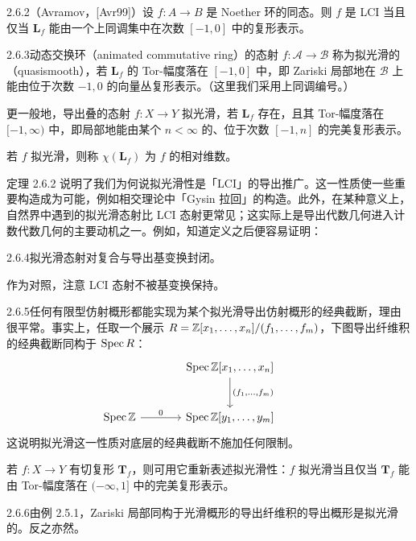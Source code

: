 
\begin{thm}{2.6.2}（Avramov，[Avr99]）设 $f\colon A\to B$ 是 Noether 环的同态。则 $f$ 是 LCI 当且仅当 $\mathbf L_f$ 能由一个上同调集中在次数 $[-1,0]$ 中的复形表示。
\end{thm}

\begin{defn}{2.6.3}动态交换环（animated commutative ring）的态射 $f\colon\mathcal A\to\mathcal B$ 称为拟光滑的（quasismooth），若 $\mathbf L_f$ 的 Tor-幅度落在 $[-1,0]$ 中，即 Zariski 局部地在 $\mathcal B$ 上能由位于次数 $-1,0$ 的向量丛复形表示。（这里我们采用上同调编号。）
\end{defn}

更一般地，导出叠的态射 $f\colon X\to Y$ 拟光滑，若 $\mathbf L_f$ 存在，且其 Tor-幅度落在 $[-1,\infty)$ 中，即局部地能由某个 $n<\infty$ 的、位于次数 $[-1,n]$ 的完美复形表示。

若 $f$ 拟光滑，则称 $\chi(\mathbf L_f)$ 为 $f$ 的相对维数。

定理 2.6.2 说明了我们为何说拟光滑性是「LCI」的导出推广。这一性质使一些重要构造成为可能，例如相交理论中「Gysin 拉回」的构造。此外，在某种意义上，自然界中遇到的拟光滑态射比 LCI 态射更常见；这实际上是导出代数几何进入计数代数几何的主要动机之一。例如，知道定义之后便容易证明：

\begin{prop}{2.6.4}拟光滑态射对复合与导出基变换封闭。
\end{prop}

作为对照，注意 LCI 态射不被基变换保持。

\begin{exam}{2.6.5}任何有限型仿射概形都能实现为某个拟光滑导出仿射概形的经典截断，理由很平常。事实上，任取一个展示 $R=\mathbb{Z}[x_1,\dots,x_n]/(f_1,\dots,f_m)$，下图导出纤维积的经典截断同构于 $\operatorname{Spec} R$：
\[
\begin{tikzcd}[column sep=large, row sep=large]
& \Spec \Z[x_1,\dots,x_n] \arrow[d, "{(f_1,\dots,f_m)}"] & \\
\Spec \Z \arrow[r, "0"] & \Spec \Z[y_1,\dots,y_m] &
\end{tikzcd}
\]
这说明拟光滑这一性质对底层的经典截断不施加任何限制。
\end{exam}

若 $f\colon X\to Y$ 有切复形 $\mathbf T_f$，则可用它重新表述拟光滑性：$f$ 拟光滑当且仅当 $\mathbf T_f$ 能由 Tor-幅度落在 $(-\infty,1]$ 中的完美复形表示。

\begin{exam}{2.6.6}由例 2.5.1，Zariski 局部同构于光滑概形的导出纤维积的导出概形是拟光滑的。反之亦然。
\end{exam}

